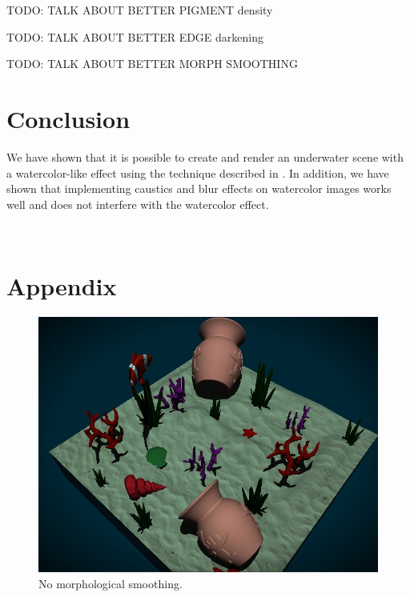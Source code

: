 \documentclass{article}
\begin{document}
TODO: TALK ABOUT BETTER PIGMENT density

TODO: TALK ABOUT BETTER EDGE darkening

TODO: TALK ABOUT BETTER MORPH SMOOTHING

\newpage
\section{Conclusion}
We have shown that it is possible to create and render an underwater scene with a watercolor-like effect using the technique described in \cite{watercolor_paper}. In addition, we have shown that implementing caustics and blur effects on watercolor images works well and does not interfere with the watercolor effect.



\newpage~\newpage
\section{Appendix}
\label{sec:appendix}

\begin{figure}[h]
    \centering
    \includegraphics[width=\columnwidth]{imgs/no_smoothing_2.jpg}
    \caption{No morphological smoothing.}
    \label{fig:no_ms}
\end{figure}

\vspace{5em}
\end{document}
